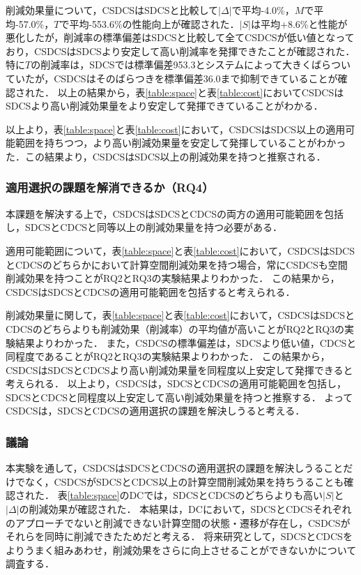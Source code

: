 削減効果量について，CSDCSはSDCSと比較して$|\Delta|$で平均-4.0\%，$M$で平均-57.0\%，$T$で平均-553.6\%の性能向上が確認された．$|S|$は平均+8.6\%と性能が悪化したが，削減率の標準偏差はSDCSと比較して全てCSDCSが低い値となっており，CSDCSはSDCSより安定して高い削減率を発揮できたことが確認された．特に$T$の削減率は，SDCSでは標準偏差953.3とシステムによって大きくばらついていたが，CSDCSはそのばらつきを標準偏差36.0まで抑制できていることが確認された．
以上の結果から，表\ref{table:space}と表\ref{table:cost}においてCSDCSはSDCSより高い削減効果量をより安定して発揮できていることがわかる．

以上より，表\ref{table:space}と表\ref{table:cost}において，CSDCSはSDCS以上の適用可能範囲を持ちつつ，より高い削減効果量を安定して発揮していることがわかった．この結果より，CSDCSはSDCS以上の削減効果を持つと推察される．

\subsubsection{適用選択の課題を解消できるか（RQ4）}
本課題を解決する上で，CSDCSはSDCSとCDCSの両方の適用可能範囲を包括し，SDCSとCDCSと同等以上の削減効果量を持つ必要がある．

適用可能範囲について，表\ref{table:space}と表\ref{table:cost}において，CSDCSはSDCSとCDCSのどちらかにおいて計算空間削減効果を持つ場合，常にCSDCSも空間削減効果を持つことがRQ2とRQ3の実験結果よりわかった．
この結果から，CSDCSはSDCSとCDCSの適用可能範囲を包括すると考えられる．

削減効果量に関して，表\ref{table:space}と表\ref{table:cost}において，CSDCSはSDCSとCDCSのどちらよりも削減効果（削減率）の平均値が高いことがRQ2とRQ3の実験結果よりわかった．
また，CSDCSの標準偏差は，SDCSより低い値，CDCSと同程度であることがRQ2とRQ3の実験結果よりわかった．
この結果から，CSDCSはSDCSとCDCSより高い削減効果量を同程度以上安定して発揮できると考えられる．
以上より，CSDCSは，SDCSとCDCSの適用可能範囲を包括し，SDCSとCDCSと同程度以上安定して高い削減効果量を持つと推察する．
よってCSDCSは，SDCSとCDCSの適用選択の課題を解決しうると考える．


\subsubsection{議論}
本実験を通して，CSDCSはSDCSとCDCSの適用選択の課題を解決しうることだけでなく，CSDCSがSDCSとCDCS以上の計算空間削減効果を持ちうることも確認された．
表\ref{table:space}のDCでは，SDCSとCDCSのどちらよりも高い$|S|$と$|\Delta|$の削減効果が確認された．
本結果は，DCにおいて，SDCSとCDCSそれぞれのアプローチでないと削減できない計算空間の状態・遷移が存在し，CSDCSがそれらを同時に削減できたためだと考える．
将来研究として，SDCSとCDCSをよりうまく組みあわせ，削減効果をさらに向上させることができないかについて調査する．

